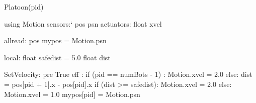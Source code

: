 Platoon(pid)

using Motion 
    sensors:`
       pos psn
    actuators:
       float xvel
       
allread:
   pos mypos = Motion.psn

local:
   float safedist = 5.0
   float dist 
   
   
SetVelocity:
  pre True
  eff :
     if (pid == numBots - 1) :
        Motion.xvel = 2.0
     else:
        dist = pos[pid + 1].x - pos[pid].x
        if (dist >= safedist):
            Motion.xvel = 2.0
        else:
            Motion.xvel = 1.0
    mypos[pid] = Motion.psn

